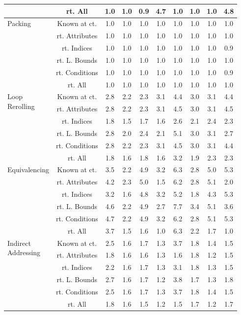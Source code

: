\documentclass{article}
\begin{document}
\begin{longtable}{|p{2cm}|c|c|c|c|c|c|c|c|c|}
 & rt. All & 1.0 & 1.0 & 0.9 & 4.7 & 1.0 & 1.0 & 1.0 & 4.8\\ \cline{2-10}
\hline
\multirow{6}{*}{ \parbox{2cm}{Packing}} & Known at ct. & 1.0 & 1.0 & 1.0 & 1.0 & 1.0 & 1.0 & 1.0 & 1.0\\ \cline{2-10}
 & rt. Attributes & 1.0 & 1.0 & 1.0 & 1.0 & 1.0 & 1.0 & 1.0 & 1.0\\ \cline{2-10}
 & rt. Indices & 1.0 & 1.0 & 1.0 & 1.0 & 1.0 & 1.0 & 1.0 & 0.9\\ \cline{2-10}
 & rt. L. Bounds & 1.0 & 1.0 & 1.0 & 1.0 & 1.0 & 1.0 & 1.0 & 1.0\\ \cline{2-10}
 & rt. Conditions & 1.0 & 1.0 & 1.0 & 1.0 & 1.0 & 1.0 & 1.0 & 0.9\\ \cline{2-10}
 & rt. All & 1.0 & 1.0 & 1.0 & 1.0 & 1.0 & 1.0 & 1.0 & 1.0\\ \cline{2-10}
\hline
\multirow{6}{*}{ \parbox{2cm}{Loop\\Rerolling}} & Known at ct. & 2.8 & 2.2 & 2.3 & 3.1 & 4.4 & 3.0 & 3.1 & 4.4\\ \cline{2-10}
 & rt. Attributes & 2.8 & 2.2 & 2.3 & 3.1 & 4.5 & 3.0 & 3.1 & 4.5\\ \cline{2-10}
 & rt. Indices & 1.8 & 1.5 & 1.7 & 1.6 & 2.6 & 2.1 & 2.4 & 2.3\\ \cline{2-10}
 & rt. L. Bounds & 2.8 & 2.0 & 2.4 & 2.1 & 5.1 & 3.0 & 3.1 & 2.7\\ \cline{2-10}
 & rt. Conditions & 2.8 & 2.2 & 2.3 & 3.1 & 4.5 & 3.0 & 3.1 & 4.4\\ \cline{2-10}
 & rt. All & 1.8 & 1.6 & 1.8 & 1.6 & 3.2 & 1.9 & 2.3 & 2.3\\ \cline{2-10}
\hline
\multirow{6}{*}{ \parbox{2cm}{Equivalencing}} & Known at ct. & 3.5 & 2.2 & 4.9 & 3.2 & 6.3 & 2.8 & 5.0 & 5.3\\ \cline{2-10}
 & rt. Attributes & 4.2 & 2.3 & 5.0 & 1.5 & 6.2 & 2.8 & 5.1 & 2.0\\ \cline{2-10}
 & rt. Indices & 3.2 & 1.6 & 4.8 & 3.2 & 5.2 & 1.8 & 4.3 & 5.3\\ \cline{2-10}
 & rt. L. Bounds & 4.6 & 2.2 & 4.9 & 2.7 & 7.7 & 3.4 & 5.1 & 3.6\\ \cline{2-10}
 & rt. Conditions & 4.7 & 2.2 & 4.9 & 3.2 & 6.2 & 2.8 & 5.1 & 5.3\\ \cline{2-10}
 & rt. All & 3.7 & 1.5 & 1.6 & 1.0 & 6.3 & 2.2 & 1.7 & 1.0\\ \cline{2-10}
\hline
\multirow{6}{*}{ \parbox{2cm}{Indirect\\Addressing}} & Known at ct. & 2.5 & 1.6 & 1.7 & 1.3 & 3.7 & 1.8 & 1.4 & 1.5\\ \cline{2-10}
 & rt. Attributes & 1.8 & 1.6 & 1.6 & 1.3 & 1.6 & 1.8 & 1.2 & 1.5\\ \cline{2-10}
 & rt. Indices & 2.2 & 1.6 & 1.7 & 1.3 & 3.1 & 1.8 & 1.3 & 1.5\\ \cline{2-10}
 & rt. L. Bounds & 2.7 & 1.6 & 1.7 & 1.2 & 3.8 & 1.7 & 1.3 & 1.8\\ \cline{2-10}
 & rt. Conditions & 2.5 & 1.6 & 1.7 & 1.3 & 3.7 & 1.8 & 1.4 & 1.5\\ \cline{2-10}
 & rt. All & 1.8 & 1.6 & 1.5 & 1.2 & 1.5 & 1.7 & 1.2 & 1.7\\ \cline{2-10}
\hline
\end{longtable}
\end{document}
